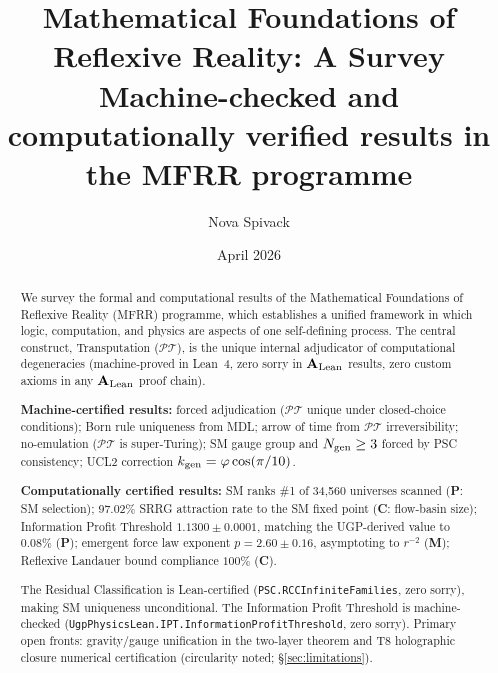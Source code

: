 \documentclass[11pt]{article}
\title{\textbf{Mathematical Foundations of Reflexive Reality: A Survey}\\[0.5em]
\large Machine-checked and computationally verified results in the MFRR programme}
\author{Nova Spivack}
\date{April 2026}
\newcommand{\PT}{\mathcal{P}\mathcal{T}}
\newcommand{\CatAL}{\ensuremath{\textbf{A}_{\rm Lean}}}
\theoremstyle{plain}
\theoremstyle{definition}
\theoremstyle{remark}
\begin{document}
\maketitle
\NovaZenodoAfterTitle

\begin{abstract}
We survey the formal and computational results of the Mathematical Foundations of
Reflexive Reality (MFRR) programme, which establishes a unified framework in which
logic, computation, and physics are aspects of one self-defining process.
The central construct, Transputation ($\PT$), is the unique internal adjudicator of
computational degeneracies (machine-proved in Lean~4, zero sorry in \CatAL{} results,
zero custom axioms in any \CatAL{} proof chain).

\textbf{Machine-certified results:} forced adjudication ($\PT$ unique under
closed-choice conditions); Born rule uniqueness from MDL; arrow of time from
$\PT$ irreversibility; no-emulation ($\PT$ is super-Turing); SM gauge group and
$N_{\rm gen} \geq 3$ forced by PSC consistency; UCL2 correction
$k_{\rm gen} = \varphi\cos(\pi/10)$.

\textbf{Computationally certified results:}
SM ranks \#1 of 34,560 universes scanned (\textbf{P}: SM selection);
97.02\% SRRG attraction rate to the SM fixed point (\textbf{C}: flow-basin size);
Information Profit Threshold $1.1300 \pm 0.0001$, matching the UGP-derived value to
$0.08\%$ (\textbf{P}); emergent force law exponent $p = 2.60 \pm 0.16$,
asymptoting to $r^{-2}$ (\textbf{M}); Reflexive Landauer bound compliance $100\%$
(\textbf{C}).

The Residual Classification is Lean-certified (\texttt{PSC.RCCInfiniteFamilies},
zero sorry), making SM uniqueness unconditional. The Information Profit Threshold is
machine-checked (\texttt{UgpPhysicsLean.IPT.InformationProfitThreshold}, zero sorry).
Primary open fronts: gravity/gauge unification in the two-layer theorem and T8
holographic closure numerical certification (circularity noted; \S\ref{sec:limitations}).
\end{abstract}

\tableofcontents
\end{document}
